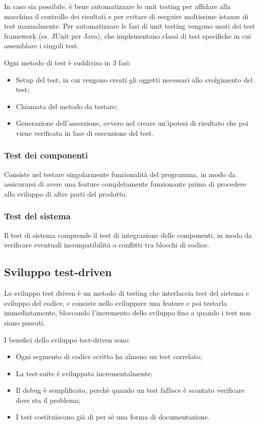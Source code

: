 \documentclass[a4paper, 10pt]{article}
\begin{document}
	In caso sia possibile, è bene automatizzare lo unit testing per affidare alla macchina il controllo dei risultati e per evitare di eseguire moltissime istanze di test manualmente. Per automatizzare le fasi di unit testing vengono usati dei test framework (es. JUnit per Java), che implementano classi di test specifiche in cui assemblare i singoli test.
	
	Ogni metodo di test è suddiviso in 3 fasi:
	\begin{itemize}
		\item Setup del test, in cui vengono creati gli oggetti necessari allo svolgimento del test;
		\item Chiamata del metodo da testare;
		\item Generazione dell'asserzione, ovvero nel creare un'ipotesi di risultato che poi viene verificata in fase di esecuzione del test.
	\end{itemize}

	\subsubsection{Test dei componenti}
	Consiste nel testare singolarmente funzionalità del programma, in modo da assicurarsi di avere una feature completamente funzionante prima di procedere allo sviluppo di altre parti del prodotto.
	
	\subsubsection{Test del sistema}
	Il test di sistema comprende il test di integrazione delle componenti, in modo da verificare eventuali incompatibilità o conflitti tra blocchi di codice.
	
	\subsection{Sviluppo test-driven}
	Lo sviluppo test driven è un metodo di testing che interlaccia test del sistema e sviluppo del codice, e consiste nello sviluppare una feature e poi testarla immediatamente, bloccando l'incremento dello sviluppo fino a quando i test non siano passati.
	
	I benefici dello sviluppo test-driven sono:
	\begin{itemize}
		\item Ogni segmento di codice scritto ha almeno un test correlato;
		\item La test-suite è sviluppata incrementalmente;
		\item Il debug è semplificato, perchè quando un test fallisce è scontato verificare dove sta il problema;
		\item I test costituiscono già di per sè una forma di documentazione.
	\end{itemize}
\end{document}
